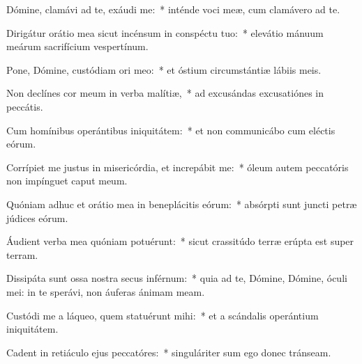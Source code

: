 \item Dómine, clamávi ad te, exáudi me:~* inténde voci meæ, cum clamávero ad te.
\item Dirigátur orátio mea sicut incénsum in conspéctu tuo:~* elevátio mánuum meárum sacrifícium vespertínum.
\item Pone, Dómine, custódiam ori meo:~* et óstium circumstántiæ lábiis meis.
\item Non declínes cor meum in verba malítiæ,~* ad excusándas excusatiónes in peccátis.
\item Cum homínibus operántibus iniquitátem:~* et non communicábo cum elé\-ctis eórum.
\item Corrípiet me justus in misericórdia, et increpábit me:~* óleum autem peccatóris non impínguet caput meum.
\item Quóniam adhuc et orátio mea in beneplácitis eórum:~* absórpti sunt juncti petræ júdices eórum.
\item Áudient verba mea quóniam potuérunt:~* sicut crassitúdo terræ erúpta est super terram.
\item Dissipáta sunt ossa nostra secus inférnum:~* quia ad te, Dómine, Dómine, óculi mei: in te sperávi, non áuferas ánimam meam.
\item Custódi me a láqueo, quem statuérunt mihi:~* et a scándalis operántium iniquitátem.
\item Cadent in retiáculo ejus peccatóres:~* singuláriter sum ego donec tránseam.